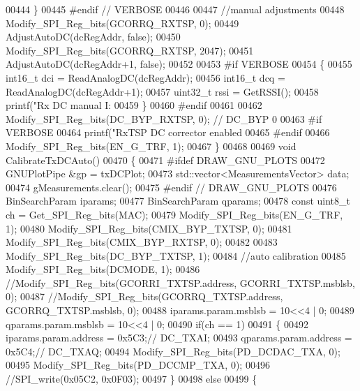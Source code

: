 \begin{DoxyCode}
{{{{{{{{00444     \}
00445 \textcolor{preprocessor}{#endif // VERBOSE}
00446 
00447     \textcolor{comment}{//manual adjustments}
00448     Modify_SPI_Reg_bits(GCORRQ_RXTSP, 0);
00449     AdjustAutoDC(dcRegAddr, \textcolor{keyword}{false});
00450     Modify_SPI_Reg_bits(GCORRQ_RXTSP, 2047);
00451     AdjustAutoDC(dcRegAddr+1, \textcolor{keyword}{false});
00452 
00453 \textcolor{preprocessor}{#if VERBOSE}
00454     \{
00455         int16\_t dci = ReadAnalogDC(dcRegAddr);
00456         int16\_t dcq = ReadAnalogDC(dcRegAddr+1);
00457         uint32\_t rssi = GetRSSI();
00458         printf(\textcolor{stringliteral}{"Rx DC manual I: %
00459     \}
00460 \textcolor{preprocessor}{#endif}
00461 
00462     Modify_SPI_Reg_bits(DC_BYP_RXTSP, 0); \textcolor{comment}{// DC\_BYP 0}
00463 \textcolor{preprocessor}{#if VERBOSE}
00464     printf(\textcolor{stringliteral}{"RxTSP DC corrector enabled %
00465 \textcolor{preprocessor}{#endif}
00466     Modify_SPI_Reg_bits(EN_G_TRF, 1);
00467 \}
00468 
00469 \textcolor{keywordtype}{void} CalibrateTxDCAuto()
00470 \{
00471 \textcolor{preprocessor}{#ifdef DRAW\_GNU\_PLOTS}
00472     GNUPlotPipe &gp = txDCPlot;
00473     std::vector<MeasurementsVector> data;
00474     gMeasurements.clear();
00475 \textcolor{preprocessor}{#endif // DRAW\_GNU\_PLOTS}
00476     BinSearchParam iparams;
00477     BinSearchParam qparams;
00478     \textcolor{keyword}{const} uint8\_t ch = Get_SPI_Reg_bits(MAC);
00479     Modify_SPI_Reg_bits(EN_G_TRF, 1);
00480     Modify_SPI_Reg_bits(CMIX_BYP_TXTSP, 0);
00481     Modify_SPI_Reg_bits(CMIX_BYP_RXTSP, 0);
00482 
00483     Modify_SPI_Reg_bits(DC_BYP_TXTSP, 1);
00484     \textcolor{comment}{//auto calibration}
00485     Modify_SPI_Reg_bits(DCMODE, 1);
00486     \textcolor{comment}{//Modify\_SPI\_Reg\_bits(GCORRI\_TXTSP.address, GCORRI\_TXTSP.msblsb, 0);}
00487     \textcolor{comment}{//Modify\_SPI\_Reg\_bits(GCORRQ\_TXTSP.address, GCORRQ\_TXTSP.msblsb, 0);}
00488     iparams.param.msblsb = 10<<4 | 0;
00489     qparams.param.msblsb = 10<<4 | 0;
00490     \textcolor{keywordflow}{if}(ch == 1)
00491     \{
00492         iparams.param.address = 0x5C3;\textcolor{comment}{// DC\_TXAI;}
00493         qparams.param.address = 0x5C4;\textcolor{comment}{// DC\_TXAQ;}
00494         Modify_SPI_Reg_bits(PD_DCDAC_TXA, 0);
00495         Modify_SPI_Reg_bits(PD_DCCMP_TXA, 0);
00496         \textcolor{comment}{//SPI\_write(0x05C2, 0x0F03);}
00497     \}
00498     \textcolor{keywordflow}{else}
00499     \{
}}}}}}}}}}
\end{DoxyCode}
